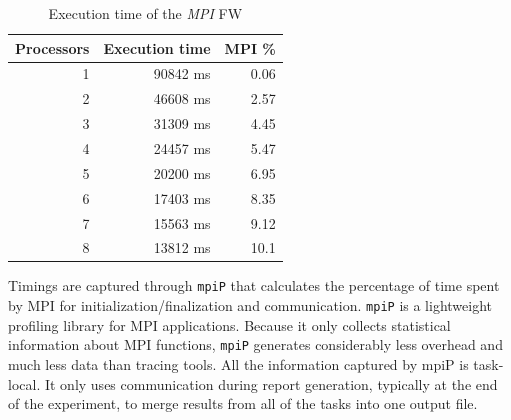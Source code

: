 \begin{table}[h!]
\centering
\begin{tabular}{|r|r|r|}
\hline
\rowcolor[HTML]{F56B00} 
{\color[HTML]{FFFFFF} \textbf{Processors}} & {\color[HTML]{FFFFFF} \textbf{Execution time}} & {\color[HTML]{FFFFFF} \textbf{MPI \%}} \\ \hline
1                                          & 90842 ms                                               & 0.06                                 \\ \hline
2                                          & 46608 ms                                               & 2.57                                 \\ \hline
3                                          & 31309 ms                                               & 4.45                                \\ \hline
4                                          & 24457 ms                                               & 5.47                                \\ \hline
5                                          & 20200 ms                                               & 6.95                                 \\ \hline
6                                          & 17403 ms                                               & 8.35                                \\ \hline
7                                          & 15563 ms                                               & 9.12                                 \\ \hline
8                                          & 13812 ms                                               & 10.1                                \\ \hline
\end{tabular}
\caption{Execution time of the \emph{MPI} FW}                                                                                                                                            
\label{tab:mpi-time}
\end{table}
Timings are captured through \texttt{mpiP} that calculates the percentage of time spent by MPI for initialization/finalization and communication.
\texttt{mpiP} is a lightweight profiling library for MPI applications. Because it only collects statistical information about MPI functions, \texttt{mpiP} generates considerably less overhead and much less data than tracing tools. All the information captured by mpiP is task-local. It only uses communication during report generation, typically at the end of the experiment, to merge results from all of the tasks into one output file.


